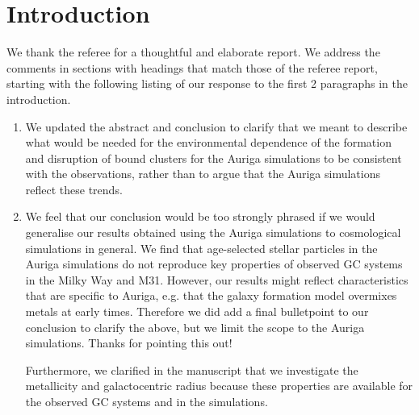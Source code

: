 \documentclass{article}
\begin{document}
\section*{Introduction}
We thank the referee for a thoughtful and elaborate report. We address the 
comments in sections with headings that match those of the referee report, 
starting with the following listing of our response to the first 2 paragraphs in 
the introduction.
\begin{enumerate}
\item We updated the abstract and conclusion to clarify that we meant to describe
what would be needed for the environmental dependence of the formation and disruption
of bound clusters for the Auriga simulations to be consistent with the observations,
rather than to argue that the Auriga simulations reflect these trends.
\item
We feel that our conclusion would be too strongly phrased if we would generalise 
our results obtained using the Auriga simulations to cosmological simulations 
in general. We find that age-selected stellar particles in the Auriga simulations 
do not reproduce key properties of observed GC systems in the Milky Way and M31.
However, our results might reflect characteristics that are specific to Auriga, 
e.g. that the galaxy formation model overmixes metals at early times. 
Therefore we did add a final bulletpoint to our conclusion to clarify the above, 
but we limit the scope to the Auriga simulations. Thanks for pointing this out!

Furthermore, we clarified in the manuscript that we investigate the metallicity
and galactocentric radius because these properties are available for the observed
GC systems and in the simulations.
\end{enumerate}
\end{document}
